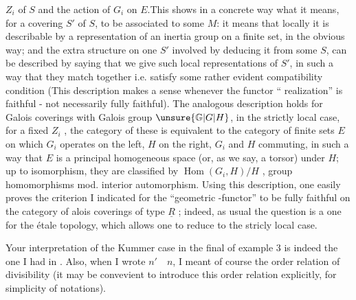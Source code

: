 $Z_i$ of $S$ and the action of $G_i$ on $E$.This shows in a  concrete way what it means,  for a covering $S'$ of $S$, to be associated to some $M$: it means that locally it is describable by a representation of an inertia group on a finite set, in the obvious way; and the extra structure on one $S'$ involved by deducing it from some $S$, can be described by saying that we give such local representations of $S'$, in such a way that they match together i.e. satisfy some rather evident compatibility condition (This description makes a sense whenever the functor `` realization'' is faithful - not necessarily fully faithful). The analogous description holds for Galois coverings with Galois group $\unsure{\mathbb{G}|G|H}$,  in the strictly local case, for a fixed $Z_i$ , the category of these is equivalent to the category of finite sets $E$ on which $G_i$ operates on the left, $H$ on the right, $G_i$ and $H$ commuting, in such a way that $E$ is a principal homogeneous space (or, as we say, a torsor) under $H$; up to isomorphism, they are classified by $\operatorname{Hom}(G_i,H)/H$ , group homomorphisms mod. interior automorphism. Using  this description, one easily proves the criterion I indicated for the ``geometric -functor'' to be fully faithful on the category of alois coverings of type $\underline{R}$ ; indeed, as usual the question is a  one for the étale topology, which allows one to  reduce to the stricly local case.

Your interpretation of the Kummer case in the final  of example 3 is indeed the one I had in . Also, when I wrote $n'\quad n$, I meant of course the order relation of divisibility (it may be convevient to introduce this order relation explicitly, for simplicity of notations).
